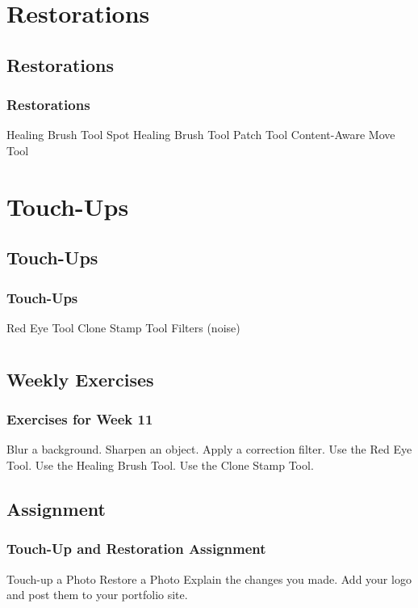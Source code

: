 \documentclass{beamer}
\begin{document}
	\section{Restorations}
			\subsection{Restorations}		
				\begin{frame}
					\frametitle{Restorations}
					\begin{outline}
						\1 Healing Brush Tool
						\1 Spot Healing Brush Tool
						\1 Patch Tool
						\1 Content-Aware Move Tool
					\end{outline}
				\end{frame}

	\section{Touch-Ups}
			\subsection{Touch-Ups}		
				\begin{frame}
					\frametitle{Touch-Ups}
						\begin{outline}
							\1 Red Eye Tool
							\1 Clone Stamp Tool
							\1 Filters (noise)
						\end{outline}
				\end{frame}
		
		\section{}
		
				\subsection{Weekly Exercises}		
	\begin{frame}
		\frametitle{Exercises for Week 11}
		\begin{outline}
			\1 Blur a background.
			\1 Sharpen an object.
			\1 Apply a correction filter.
			\1 Use the Red Eye Tool.
			\1 Use the Healing Brush Tool.
			\1 Use the Clone Stamp Tool.
		\end{outline}
	\end{frame}


	\subsection{Assignment}		
	\begin{frame}
		\frametitle{Touch-Up and Restoration Assignment}
		\begin{outline}
			\1 Touch-up a Photo
			\1 Restore a Photo
			\1 Explain the changes you made.
			\1 Add your logo and post them to your portfolio site.
		\end{outline}
	\end{frame}
	
			
\end{document}
